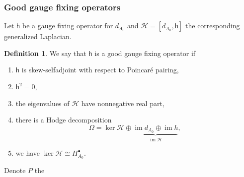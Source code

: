 \documentclass[11pt,a4paper]{amsart}
\theoremstyle{plain} %
\theoremstyle{definition}
\newtheorem{defn}[thm]{Definition}
\theoremstyle{remark}
\newcommand{\sh}{\mathsf{h}}
\newcommand{\HHH}{\mathcal{H}}
\begin{document}
{\subsubsection{Good gauge fixing operators}
Let $\sh$ be a gauge fixing operator for $d_{A_0}$ and $\HHH= [d_{A_0},\sh]$  the corresponding generalized Laplacian.  \begin{defn} 
We say that $\sh$ is a good gauge fixing operator if
\begin{enumerate}
\item $\sh$ is skew-selfadjoint with respect to Poincar\'e pairing,
    \item $\sh^2 = 0$, 
    \item the eigenvalues of $\HHH$ have nonnegative real part,
    \item there is a Hodge decomposition
     \begin{equation}%
     \Omega = \ker \HHH \oplus \underbrace{\operatorname{im} d_{A_0} \oplus \operatorname{im} h}_{\operatorname{im} \HHH} , \label{eq: decomposition disj}
     \end{equation}
     \item we have $\ker \HHH \cong H^\bullet_{A_0}$.
\end{enumerate}
\end{defn}
Denote $P$  the %
}
\end{document}

